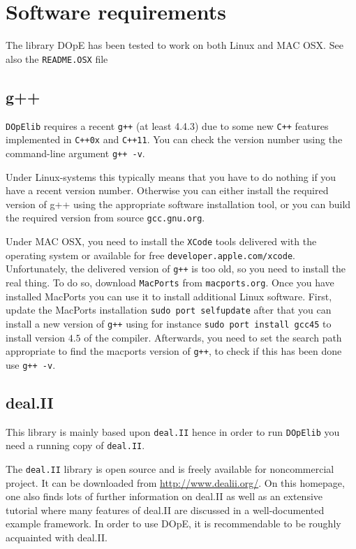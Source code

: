 \section{Software requirements}
The library DOpE has been tested to work on both Linux and 
MAC OSX. See also the \texttt{README.OSX} file 

\subsection{g++}
\texttt{DOpElib} requires a recent \texttt{g++} (at least 4.4.3) due to 
some new \texttt{C++} features implemented in \texttt{C++0x} and \texttt{C++11}. 
You can check the version number using the command-line argument \texttt{g++ -v}.

Under Linux-systems this typically means that you have to do nothing if you have a recent 
version number. Otherwise you can either install the required version of g++ using the 
appropriate software installation tool, or you can build the required version from 
source \texttt{gcc.gnu.org}.

Under MAC OSX, you need to install the \texttt{XCode} tools delivered with the operating system 
or available for free \texttt{developer.apple.com/xcode}. Unfortunately, the delivered 
version of \texttt{g++} is too old, so you need to install the real thing. To do so, 
download \texttt{MacPorts} from \texttt{macports.org}. Once you have installed MacPorts 
you can use it to install additional Linux software. 
First, update the MacPorts installation \texttt{sudo port selfupdate}
after that you can install a new version of \texttt{g++} using for instance 
\texttt{sudo port install gcc45} to install version $4.5$ of the compiler.
Afterwards, you need to set the search path appropriate to find the macports version
of \texttt{g++}, to check if this has been done use \texttt{g++ -v}.

\subsection{deal.II}
This library is mainly based upon \texttt{deal.II} hence in order to run 
\texttt{DOpElib} you need a running copy of \texttt{deal.II}.

The \texttt{deal.II} library is open source and is freely available for noncommercial project.
It can be downloaded from \url{http://www.dealii.org/}. On this
homepage, one also finds lots of further information on deal.II as well as
an extensive tutorial where many features of deal.II are discussed in a
well-documented example framework. In order to use DOpE, it is
recommendable to be roughly acquainted with deal.II.

